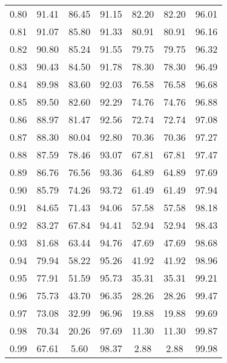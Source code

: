 \begin{tabular}{|c|c|c|c|c|c|c|}
      0.80 &     91.41 &     86.45 &      91.15 &   82.20 &      82.20 &         96.01 \\
      0.81 &     91.07 &     85.80 &      91.33 &   80.91 &      80.91 &         96.16 \\
      0.82 &     90.80 &     85.24 &      91.55 &   79.75 &      79.75 &         96.32 \\
      0.83 &     90.43 &     84.50 &      91.78 &   78.30 &      78.30 &         96.49 \\
      0.84 &     89.98 &     83.60 &      92.03 &   76.58 &      76.58 &         96.68 \\
      0.85 &     89.50 &     82.60 &      92.29 &   74.76 &      74.76 &         96.88 \\
      0.86 &     88.97 &     81.47 &      92.56 &   72.74 &      72.74 &         97.08 \\
      0.87 &     88.30 &     80.04 &      92.80 &   70.36 &      70.36 &         97.27 \\
      0.88 &     87.59 &     78.46 &      93.07 &   67.81 &      67.81 &         97.47 \\
      0.89 &     86.76 &     76.56 &      93.36 &   64.89 &      64.89 &         97.69 \\
      0.90 &     85.79 &     74.26 &      93.72 &   61.49 &      61.49 &         97.94 \\
      0.91 &     84.65 &     71.43 &      94.06 &   57.58 &      57.58 &         98.18 \\
      0.92 &     83.27 &     67.84 &      94.41 &   52.94 &      52.94 &         98.43 \\
      0.93 &     81.68 &     63.44 &      94.76 &   47.69 &      47.69 &         98.68 \\
      0.94 &     79.94 &     58.22 &      95.26 &   41.92 &      41.92 &         98.96 \\
      0.95 &     77.91 &     51.59 &      95.73 &   35.31 &      35.31 &         99.21 \\
      0.96 &     75.73 &     43.70 &      96.35 &   28.26 &      28.26 &         99.47 \\
      0.97 &     73.08 &     32.99 &      96.96 &   19.88 &      19.88 &         99.69 \\
      0.98 &     70.34 &     20.26 &      97.69 &   11.30 &      11.30 &         99.87 \\
      0.99 &     67.61 &      5.60 &      98.37 &    2.88 &       2.88 &         99.98 \\
\bottomrule
\end{tabular}
